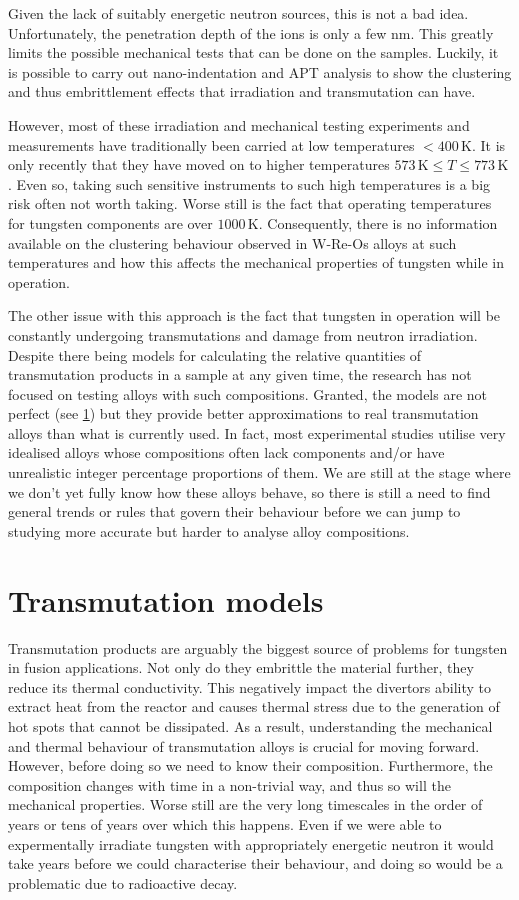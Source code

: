 \documentclass[12pt, a4paper]{article}
\newcommand{\tr}{transmutation}
\begin{document}
		Given the lack of suitably energetic neutron sources, this is not a bad idea. Unfortunately, the penetration depth of the ions is only a few nm. This greatly limits the possible mechanical tests that can be done on the samples. Luckily, it is possible to carry out nano-indentation and APT analysis to show the clustering and thus embrittlement effects that irradiation and transmutation can have.
		
		However, most of these irradiation and mechanical testing experiments and measurements have traditionally been carried at low temperatures $< 400\,\textrm{K}$. It is only recently that they have moved on to higher temperatures $573\,\textrm{K} \le T \le 773\,\textrm{K}$. Even so, taking such sensitive instruments to such high temperatures is a big risk often not worth taking. Worse still is the fact that operating temperatures for tungsten components are over $1000\,\textrm{K}$. Consequently, there is no information available on the clustering behaviour observed in W-Re-Os alloys at such temperatures and how this affects the mechanical properties of tungsten while in operation.
		
		The other issue with this approach is the fact that tungsten in operation will be constantly undergoing \tr{s} and damage from neutron irradiation. Despite there being models for calculating the relative quantities of transmutation products in a sample at any given time, the research has not focused on testing alloys with such compositions. Granted, the models are not perfect (see \cref{s:tm}) but they provide better approximations to real transmutation alloys than what is currently used. In fact, most experimental studies utilise very idealised alloys whose compositions often lack components and/or have unrealistic integer percentage proportions of them. We are still at the stage where we don't yet fully know how these alloys behave, so there is still a need to find general trends or rules that govern their behaviour before we can jump to studying more accurate but harder to analyse alloy compositions.
		\section{Transmutation models}\label{s:tm}
		Transmutation products are arguably the biggest source of problems for tungsten in fusion applications. Not only do they embrittle the material further, they reduce its thermal conductivity. This negatively impact the divertors ability to extract heat from the reactor and causes thermal stress due to the generation of hot spots that cannot be dissipated. As a result, understanding the mechanical and thermal behaviour of transmutation alloys is crucial for moving forward. However, before doing so we need to know their composition. Furthermore, the composition changes with time in a non-trivial way, and thus so will the mechanical properties. Worse still are the very long timescales in the order of years or tens of years over which this happens. Even if we were able to expermentally irradiate tungsten with appropriately energetic neutron it would take years before we could characterise their behaviour, and doing so would be a problematic due to radioactive decay.
		
\end{document}

